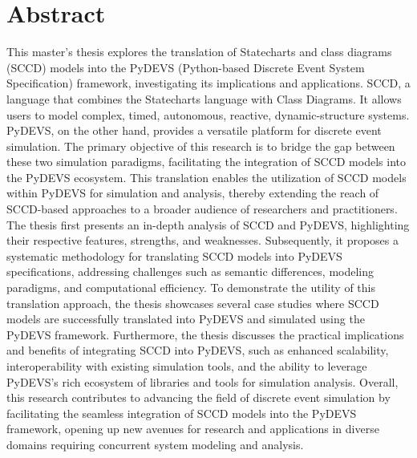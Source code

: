 \clearpage 
{} 
{}
\chapter*{Abstract}
This master's thesis explores the translation of Statecharts and class diagrams (SCCD) models into the PyDEVS (Python-based Discrete Event System Specification) framework, investigating its implications and applications. 
SCCD, a language that combines the Statecharts language with Class Diagrams. It allows users to model complex, timed, autonomous, reactive, dynamic-structure systems. PyDEVS, on the other hand, provides a versatile platform 
for discrete event simulation. The primary objective of this research is to bridge the gap between these two simulation paradigms, facilitating the integration of SCCD models into the PyDEVS ecosystem. This translation 
enables the utilization of SCCD models within PyDEVS for simulation and analysis, thereby extending the reach of SCCD-based approaches to a broader audience of researchers and practitioners. The thesis first presents an 
in-depth analysis of SCCD and PyDEVS, highlighting their respective features, strengths, and weaknesses. Subsequently, it proposes a systematic methodology for translating SCCD models into PyDEVS specifications, addressing 
challenges such as semantic differences, modeling paradigms, and computational efficiency. To demonstrate the utility of this translation approach, the thesis showcases several case studies where SCCD models are successfully 
translated into PyDEVS and simulated using the PyDEVS framework. Furthermore, the thesis discusses the practical implications and benefits of integrating SCCD into PyDEVS, such as enhanced scalability, interoperability with 
existing simulation tools, and the ability to leverage PyDEVS's rich ecosystem of libraries and tools for simulation analysis. Overall, this research contributes to advancing the field of discrete event simulation by 
facilitating the seamless integration of SCCD models into the PyDEVS framework, opening up new avenues for research and applications in diverse domains requiring concurrent system modeling and analysis.